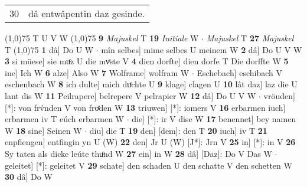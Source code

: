 \documentclass[8pt,a4paper,notitlepage]{article}
\begin{document}
\begin{table}[ht]
\begin{minipage}[t]{0.5\linewidth}
\begin{tabular}{rl}
30 & dâ entwâpentin daz gesinde.\\ 
\end{tabular}
\scriptsize
\line(1,0){75} \newline
T U V W \newline
\line(1,0){75} \newline
\textbf{9} \textit{Majuskel} T  \textbf{19} \textit{Initiale} W   $\cdot$ \textit{Majuskel} T  \textbf{27} \textit{Majuskel} T  \newline
\line(1,0){75} \newline
\textbf{1} dâ] Do U W  $\cdot$ mîn selbes] mime selbes U meinem W \textbf{2} dâ] Do U V W \textbf{3} si müese] sie muͦz U die mvͤste V \textbf{4} dien dorfte] dien dorfe T Die dorffte W \textbf{5} ine] Ich W \textbf{6} alze] Also W \textbf{7} Wolframe] wolfram W  $\cdot$ Eschebach] eschibach V eschenbach W \textbf{8} ich dulte] mich duͦchte U \textbf{9} klage] clagen U \textbf{10} lât daz] laz die U lant dis W \textbf{11} Peilrapere] belrepere V pelrapier W \textbf{12} dâ] Do U V W  $\cdot$ vröuden] [*]: von frv́nden V von froͤden W \textbf{13} triuwen] [*]: iomers V \textbf{16} erbarmen iuch] erbarmen iv T eúch erbarmen W  $\cdot$ die] [*]: ir V dise W \textbf{17} benennet] bey namen W \textbf{18} sine] Seinen W  $\cdot$ diu] die T \textbf{19} den] [dem]: den T \textbf{20} iuch] iv T \textbf{21} enpfiengen] entfingin yn U (W) \textbf{22} den] Jr U (W) [J*]: Jrn  V \textbf{25} in] [*]: in V \textbf{26} Sy taten als dicke leúte thuͦnd W \textbf{27} ein] in W \textbf{28} dâ] [Daz]: Do V Das W  $\cdot$ geleitet] [*]: geleitet V \textbf{29} schate] den schaden U den schatte V den schetten W \textbf{30} dâ] Do W \newline
\end{minipage}
\end{table}
\end{document}
